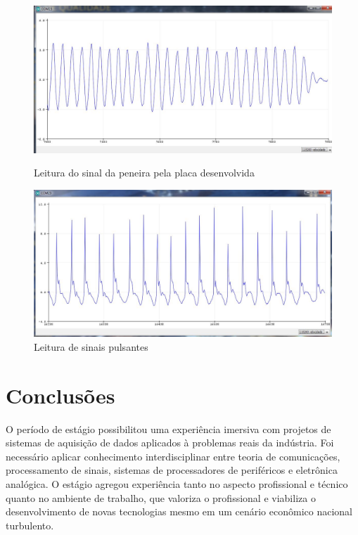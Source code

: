 \documentclass[
	12pt,				%
	openright,			%
	twoside,			%
	a4paper,			%
	english,			%
	french,				%
	spanish,			%
	brazil,				%
	]{abntex2}
\begin{document}
		\begin{figure}[!ht]
			\centering
			\begin{minipage}{0.4\linewidth}
				\centering
				\includegraphics[width = \linewidth]{../Fotos/sinal3g.jpg}
				\caption{Leitura do sinal da peneira pela placa desenvolvida}
			\end{minipage}
			\hfill\vline\hfill
			\begin{minipage}{0.4\linewidth}
				\centering
				\includegraphics[width = \linewidth]{../Fotos/pulsante.jpg}
				\caption{Leitura de sinais pulsantes}
			\end{minipage}
		\end{figure}

\chapter{Conclusões}

	O período de estágio possibilitou uma experiência imersiva com
	projetos de sistemas de aquisição de dados aplicados à problemas
	reais da indústria. Foi necessário aplicar conhecimento
	interdisciplinar entre teoria de comunicações, processamento de
	sinais, sistemas de processadores de periféricos e eletrônica
	analógica. O estágio agregou experiência tanto no aspecto
	profissional e técnico quanto no ambiente de trabalho, que valoriza
	o profissional e viabiliza o desenvolvimento de novas tecnologias
	mesmo em um cenário econômico nacional turbulento.
\end{document}
